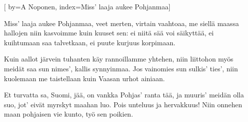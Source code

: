 
[
  by={A Noponen},
  index={Miss' laaja aukee Pohjanmaa}]
  
\beginverse*
Miss' laaja aukee Pohjanmaa,
veet merten, virtain vaahtoaa,
me siellä maassa hallojen
niin kasvoimme kuin kuuset sen:
ei niitä sää voi säikyttää,
ei kuihtumaan saa talvetkaan,
ei puute kurjuus korpimaan.
\endverse

\beginverse*
Kuin aallot järvein tuhanten
käy rannoillamme yhtehen,
niin liittohon myös meidät saa
sun nimes', kallis synnyinmaa.
Jos vainomies sun sulkis' ties',
niin kuolemaan me taistellaan
kuin Vaasan urhot ainiaan.
\endverse

\beginverse*
Et turvatta sa, Suomi, jää,
on vankka Pohjas' ranta tää,
ja muuris' meidän olla suo,
jot' eivät myrskyt maahan luo.
Pois unteluus ja hervakkuus!
Niin onnehen maan pohjaisen
vie kunto, työ sen poikien.
\endverse
\endsong